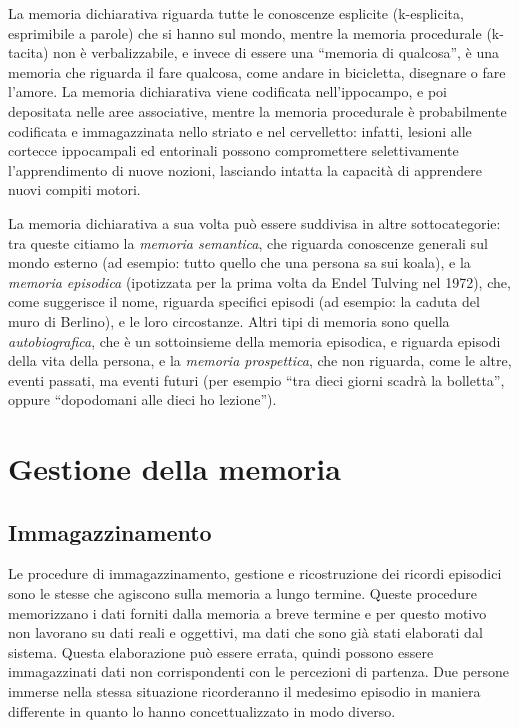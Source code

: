 La memoria dichiarativa riguarda tutte le conoscenze esplicite (k-esplicita, esprimibile a parole) che si hanno sul mondo, mentre la memoria procedurale (k-tacita) non è verbalizzabile, e invece di essere una ``memoria di qualcosa'', è una memoria che riguarda il fare qualcosa, come andare in bicicletta, disegnare o fare l'amore. La memoria dichiarativa viene codificata nell'ippocampo, e poi depositata nelle aree associative, mentre la memoria procedurale è probabilmente codificata e immagazzinata nello striato e nel cervelletto: infatti, lesioni alle cortecce ippocampali ed entorinali possono compromettere selettivamente l'apprendimento di nuove nozioni, lasciando intatta la capacità di apprendere nuovi compiti motori.

La memoria dichiarativa a sua volta può essere suddivisa in altre sottocategorie: tra queste citiamo la \emph{memoria semantica}, che riguarda conoscenze generali sul mondo esterno (ad esempio: tutto quello che una persona sa sui koala), e la \emph{memoria episodica} (ipotizzata per la prima volta da Endel Tulving nel 1972), che, come suggerisce il nome, riguarda specifici episodi (ad esempio: la caduta del muro di Berlino), e le loro circostanze. Altri tipi di memoria sono quella \emph{autobiografica}, che è un sottoinsieme della memoria episodica, e riguarda episodi della vita della persona, e la \emph{memoria prospettica}, che non riguarda, come le altre, eventi passati, ma eventi futuri (per esempio ``tra dieci giorni scadrà la bolletta'', oppure ``dopodomani alle dieci ho lezione'').

\section{Gestione della memoria}
\subsection{Immagazzinamento}
Le procedure di immagazzinamento, gestione e ricostruzione dei ricordi episodici sono le stesse che agiscono sulla memoria a lungo termine. Queste procedure memorizzano i dati forniti dalla memoria a breve termine e per questo motivo non lavorano su dati reali e oggettivi, ma dati che sono già stati elaborati dal sistema. Questa elaborazione può essere errata, quindi possono essere immagazzinati dati non corrispondenti con le percezioni di partenza. Due persone immerse nella stessa situazione ricorderanno il medesimo episodio in maniera differente in quanto lo hanno concettualizzato in modo diverso.

